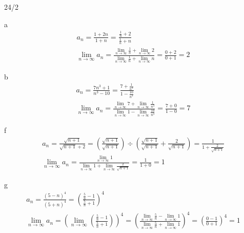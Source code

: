 \newpage
\begin{exercise}{24/2}
  \item [a]
  \begin{gather*}
    a_n = \frac{1 + 2n}{1 + n} = \frac{\frac{1}{n} + 2}{\frac{1}{n} + n} \\
    \lim\limits_{n \to \infty} a_n = \frac{\lim\limits_{n \to \infty} \frac{1}{n} + \lim\limits_{n \to \infty} 2}{\lim\limits_{n \to \infty} \frac{1}{n} + \lim\limits_{n \to \infty} n} = \frac{0 + 2}{0 + 1} = 2
  \end{gather*}
  \item [b]
  \begin{gather*}
    a_n = \frac{7n^3 + 1}{n^3 - 10} = \frac{7 + \frac{1}{n^3}}{1 - \frac{10}{n^3}} \\
    \lim\limits_{n \to \infty} a_n = \frac{\lim\limits_{n \to \infty} 7 + \lim\limits_{n \to \infty} \frac{1}{n^3}}{\lim\limits_{n \to \infty} 1 - \lim\limits_{n \to \infty} \frac{10}{n^3}} = \frac{7 + 0}{1 - 0} = 7
  \end{gather*}
  \item [f]
  \begin{gather*}
    a_n = \frac{\sqrt{n + 1}}{\sqrt{n + 1} + 2} = (\frac{\sqrt{n + 1}}{\sqrt{n + 1}}) \div (\frac{\sqrt{n + 1}}{\sqrt{n + 1}} + \frac{2}{\sqrt{n + 1}}) = \frac{1}{1 + \frac{2}{\sqrt{n + 1}}} \\
    \lim\limits_{n \to \infty} a_n = \frac{\lim\limits_{n \to \infty} 1}{\lim\limits_{n \to \infty} 1 + \lim\limits_{n \to \infty} \frac{2}{\sqrt{n + 1}}} = \frac{1}{1 + 0} = 1
  \end{gather*}
  \item [g]
  \begin{gather*}
    a_n = \frac{(5 - n)^4}{(5 + n)^4} = (\frac{\frac{5}{n} - 1}{\frac{5}{n} + 1})^4 \\
    \lim\limits_{n \to \infty} a_n = (\lim\limits_{n \to \infty} (\frac{\frac{5}{n} - 1}{\frac{5}{n} + 1}))^4 = (\frac{\lim\limits_{n \to \infty} \frac{5}{n} - \lim\limits_{n \to \infty} 1}{\lim\limits_{n \to \infty} \frac{5}{n} + \lim\limits_{n \to \infty} 1})^4 = (\frac{0 - 1}{0 + 1})^4 = 1
  \end{gather*}
\end{exercise}

